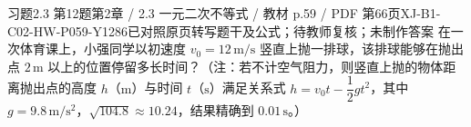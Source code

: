 \par\noindent\begin{minipage}{\linewidth}
\begin{bankitem}{习题2.3 第12题}{第2章 / 2.3 一元二次不等式 / 教材 p.59 / PDF 第66页}{XJ-B1-C02-HW-P059-Y1286}{已对照原页转写题干及公式；待教师复核；未制作答案}
在一次体育课上，小强同学以初速度 $v_0=12\,\mathrm{m/s}$ 竖直上抛一排球，该排球能够在抛出点 $2\,\mathrm m$ 以上的位置停留多长时间？（注：若不计空气阻力，则竖直上抛的物体距离抛出点的高度 $h$（$\mathrm m$）与时间 $t$（$\mathrm s$）满足关系式 $h=v_0t-\dfrac12gt^2$，其中 $g=9.8\,\mathrm{m/s^2}$，$\sqrt{104.8}\approx10.24$，结果精确到 $0.01\,\mathrm s$。）
\end{bankitem}
\end{minipage}\par\medskip
